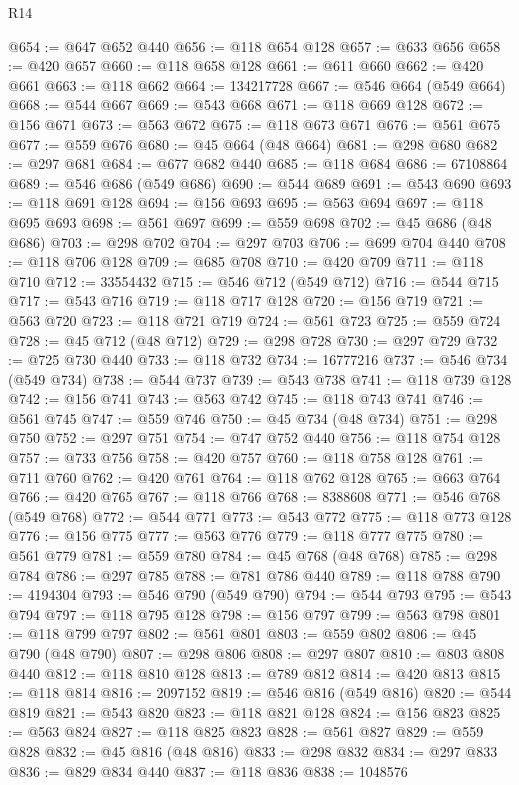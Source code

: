 \begin{lexlean}{R14}
\begin{coremodule}
{{{{{{{{{{{{{{{{{{{{{{{{{{{{{{{{{{{{{{{{{{{{{{{{{{{{{{{{{{{{{{{{{{{{{{{{{{{{{{{{{{@654 := @647 @652 @440
@656 := @118 @654 @128
@657 := @633 @656
@658 := @420 @657
@660 := @118 @658 @128
@661 := @611 @660
@662 := @420 @661
@663 := @118 @662
@664 := 134217728
@667 := @546 @664 (@549 @664)
@668 := @544 @667
@669 := @543 @668
@671 := @118 @669 @128
@672 := @156 @671
@673 := @563 @672
@675 := @118 @673 @671
@676 := @561 @675
@677 := @559 @676
@680 := @45 @664 (@48 @664)
@681 := @298 @680
@682 := @297 @681
@684 := @677 @682 @440
@685 := @118 @684
@686 := 67108864
@689 := @546 @686 (@549 @686)
@690 := @544 @689
@691 := @543 @690
@693 := @118 @691 @128
@694 := @156 @693
@695 := @563 @694
@697 := @118 @695 @693
@698 := @561 @697
@699 := @559 @698
@702 := @45 @686 (@48 @686)
@703 := @298 @702
@704 := @297 @703
@706 := @699 @704 @440
@708 := @118 @706 @128
@709 := @685 @708
@710 := @420 @709
@711 := @118 @710
@712 := 33554432
@715 := @546 @712 (@549 @712)
@716 := @544 @715
@717 := @543 @716
@719 := @118 @717 @128
@720 := @156 @719
@721 := @563 @720
@723 := @118 @721 @719
@724 := @561 @723
@725 := @559 @724
@728 := @45 @712 (@48 @712)
@729 := @298 @728
@730 := @297 @729
@732 := @725 @730 @440
@733 := @118 @732
@734 := 16777216
@737 := @546 @734 (@549 @734)
@738 := @544 @737
@739 := @543 @738
@741 := @118 @739 @128
@742 := @156 @741
@743 := @563 @742
@745 := @118 @743 @741
@746 := @561 @745
@747 := @559 @746
@750 := @45 @734 (@48 @734)
@751 := @298 @750
@752 := @297 @751
@754 := @747 @752 @440
@756 := @118 @754 @128
@757 := @733 @756
@758 := @420 @757
@760 := @118 @758 @128
@761 := @711 @760
@762 := @420 @761
@764 := @118 @762 @128
@765 := @663 @764
@766 := @420 @765
@767 := @118 @766
@768 := 8388608
@771 := @546 @768 (@549 @768)
@772 := @544 @771
@773 := @543 @772
@775 := @118 @773 @128
@776 := @156 @775
@777 := @563 @776
@779 := @118 @777 @775
@780 := @561 @779
@781 := @559 @780
@784 := @45 @768 (@48 @768)
@785 := @298 @784
@786 := @297 @785
@788 := @781 @786 @440
@789 := @118 @788
@790 := 4194304
@793 := @546 @790 (@549 @790)
@794 := @544 @793
@795 := @543 @794
@797 := @118 @795 @128
@798 := @156 @797
@799 := @563 @798
@801 := @118 @799 @797
@802 := @561 @801
@803 := @559 @802
@806 := @45 @790 (@48 @790)
@807 := @298 @806
@808 := @297 @807
@810 := @803 @808 @440
@812 := @118 @810 @128
@813 := @789 @812
@814 := @420 @813
@815 := @118 @814
@816 := 2097152
@819 := @546 @816 (@549 @816)
@820 := @544 @819
@821 := @543 @820
@823 := @118 @821 @128
@824 := @156 @823
@825 := @563 @824
@827 := @118 @825 @823
@828 := @561 @827
@829 := @559 @828
@832 := @45 @816 (@48 @816)
@833 := @298 @832
@834 := @297 @833
@836 := @829 @834 @440
@837 := @118 @836
@838 := 1048576
}}}}}}}}}}}}}}}}}}}}}}}}}}}}}}}}}}}}}}}}}}}}}}}}}}}}}}}}}}}}}}}}}}}}}}}}}}}}}}}}}}
\end{coremodule}
\end{lexlean}
